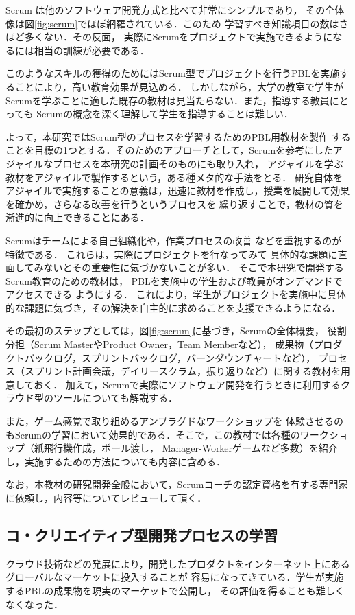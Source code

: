 \documentclass[a4j,9pt,twoside]{jarticle}
\begin{document}
\begin{multicols}{2}
	Scrum は他のソフトウェア開発方式と比べて非常にシンプルであり，
	その全体像は図\ref{fig:scrum}でほぼ網羅されている．このため
	学習すべき知識項目の数はさほど多くない．その反面，
	実際にScrumをプロジェクトで実施できるようになるには相当の訓練が必要である．

	このようなスキルの獲得のためにはScrum型でプロジェクトを行うPBLを実施することにより，高い教育効果が見込める．
	しかしながら，大学の教室で学生がScrumを学ぶことに適した既存の教材は見当たらない．また，指導する教員にとっても
	Scrumの概念を深く理解して学生を指導することは難しい．

	よって，本研究ではScrum型のプロセスを学習するためのPBL用教材を製作
	することを目標の1つとする．そのためのアプローチとして，Scrumを参考にしたアジャイルなプロセスを本研究の計画そのものにも取り入れ，
	アジャイルを学ぶ教材をアジャイルで製作するという，ある種メタ的な手法をとる．
	研究自体をアジャイルで実施することの意義は，迅速に教材を作成し，授業を展開して効果を確かめ，さらなる改善を行うというプロセスを
	繰り返すことで，教材の質を漸進的に向上できることにある．
	
	Scrumはチームによる自己組織化や，作業プロセスの改善
	などを重視するのが特徴である．
	これらは，実際にプロジェクトを行なってみて
	具体的な課題に直面してみないとその重要性に気づかないことが多い．
	そこで本研究で開発するScrum教育のための教材は，
	PBLを実施中の学生および教員がオンデマンドでアクセスできる
	ようにする．
	これにより，学生がプロジェクトを実施中に具体的な課題に気づき，その解決を自主的に求めることを支援できるようになる．
	
	その最初のステップとしては，図\ref{fig:scrum}に基づき，Scrumの全体概要，
	役割分担（Scrum MasterやProduct Owner，Team Memberなど），
	成果物（プロダクトバックログ，スプリントバックログ，バーンダウンチャートなど），
	プロセス（スプリント計画会議，デイリースクラム，振り返りなど）に関する教材を用意しておく．
	加えて，Scrumで実際にソフトウェア開発を行うときに利用するクラウド型のツールについても解説する．

	また，ゲーム感覚で取り組めるアンプラグドなワークショップを
	体験させるのもScrumの学習において効果的である．そこで，この教材では各種のワークショップ（紙飛行機作成，ボール渡し，
	Manager-Workerゲームなど多数）を紹介し，実施するための方法についても内容に含める．

	なお，本教材の研究開発全般において，Scrumコーチの認定資格を有する専門家に依頼し，内容等についてレビューして頂く．

\subsection{コ・クリエイティブ型開発プロセスの学習}
	クラウド技術などの発展により，開発したプロダクトをインターネット上にあるグローバルなマーケットに投入することが
	容易になってきている．学生が実施するPBLの成果物を現実のマーケットで公開し，
	その評価を得ることも難しくなくなった．
	

\end{multicols}
\end{document}
